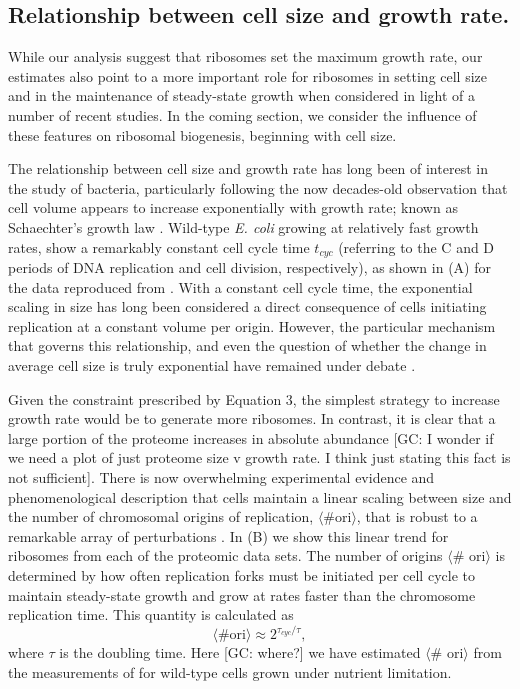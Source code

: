 \subsection{Relationship between cell size and growth rate.}

While our analysis suggest that ribosomes set the maximum growth rate,  our
estimates also point to a more important role for ribosomes in setting  cell
size and in the maintenance of steady-state growth  when considered in light of
a number of recent studies. In the coming section, we consider the influence of
these features on ribosomal biogenesis, beginning with cell size. 

 The relationship between cell size and growth rate has
long been of interest in the study of bacteria, particularly following the now
decades-old observation that cell volume appears to increase exponentially with
growth rate; known as Schaechter's growth law  \citep{schaechter1958,
taheriaraghi2015}. Wild-type \textit{E. coli} growing at relatively fast growth
rates, show a remarkably constant cell cycle time $t_{cyc}$ (referring to the C
and D periods of DNA replication and cell division, respectively), as shown in
(A) for the data reproduced from \citep{si2017}.
With a constant cell cycle time, the exponential scaling in size has long been
considered a direct consequence of cells initiating replication at a constant
volume per origin. However, the particular mechanism that governs this
relationship, and even the question of whether the change in average cell size
is truly exponential  have remained under debate \citep{si2017, harris2018}.

Given the constraint prescribed by Equation 3, the simplest strategy to increase
growth rate would be to generate more ribosomes. In contrast, it is clear
that a large portion of the proteome increases in absolute abundance
{\color{red}[GC: I wonder if we need a plot of just proteome size v growth rate.
I think just stating this fact is not sufficient]}. There is now overwhelming 
experimental evidence and phenomenological description that cells
maintain a linear scaling between size and the number of chromosomal origins of
replication, $\langle\text{\# ori}\rangle$, that is robust to a
remarkable array of perturbations \citep{si2017}. In
(B) we show this linear trend for ribosomes  from
each of the  proteomic data sets.  The number of origins $\langle$\# ori$\rangle$ is determined by how
often replication forks must be initiated per cell cycle to maintain
steady-state growth and grow at rates faster than the chromosome replication
time. This quantity is calculated as 
\begin{equation}
    \langle \text{\# ori} \rangle \approx 2^{\tau_{cyc} / \tau},
\end{equation}
where $\tau$ is the doubling time. Here {\color{red}[GC: where?]} we have estimated
$\langle$\# ori$\rangle$ from the measurements of \cite{si2017} for wild-type cells grown under nutrient
limitation.

